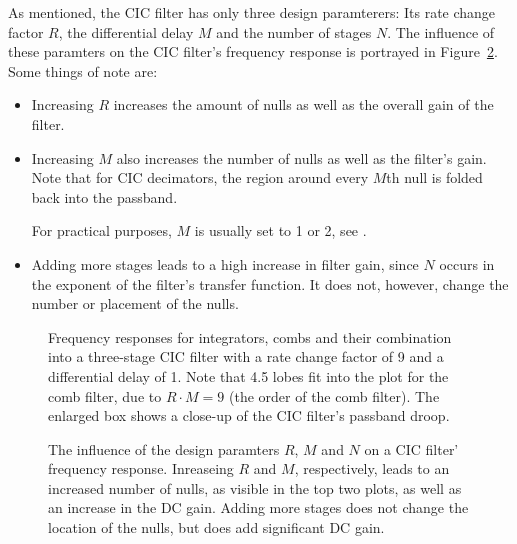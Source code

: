 As  mentioned, the  CIC filter  has  only three  design paramterers: Its  rate
change factor  $R$, the differential delay  $M$ and the number  of stages $N$.
The influence  of these paramters  on the  CIC filter's frequency  response is
portrayed in Figure~\ref{fig:cic:freq_responses:var}. Some things of note are:
\begin{itemize}\tightlist
    \item
        Increasing $R$  increases the amount of  nulls as well as  the overall
        gain of the filter.
    \item
        Increasing  $M$ also  increases the  number of  nulls as  well as  the
        filter's gain.  Note that for  CIC decimators, the region around every
        $M$th null is folded back into the passband.

        For practical purposes, $M$ is usually  set to \num{1} or \num{2}, see
        \cite{1163535}.
    \item
        Adding more stages leads to a  high increase in filter gain, since $N$
        occurs in the exponent of the filter's transfer function. It does not,
        however, change the number or placement of the nulls.
\end{itemize}

\begin{figure}
    \centering
        
        \caption[Frequency Responses for Integrators, Combs and CIC Filters]{%
            Frequency responses  for integrators, combs and  their combination
            into a three-stage CIC filter with a rate change factor of \num{9}
            and a differential delay of \num{1}.\protect\newline
            Note that \num{4.5}  lobes fit into the plot for  the comb filter,
            due to $R\cdot M = 9$ (the order of the comb filter).
            The enlarged  box shows  a close-up of  the CIC  filter's passband
            droop.%
        }
        \label{fig:cic:freq_responses}
\end{figure}

\begin{figure}
    \centering
        
        \caption[Influence of Design Parameters on Frequency Response]{%
            The influence  of the design paramters  $R$, $M$ and $N$  on a CIC
            filter' frequency response.\protect\newline
            Inreaseing $R$ and $M$, respectively, leads to an increased number
            of nulls, as visible in the top  two plots, as well as an increase
            in the DC gain.\protect\newline
            Adding more stages does not change  the location of the nulls, but
            does add significant DC gain.%
        }
        \label{fig:cic:freq_responses:var}
\end{figure}

